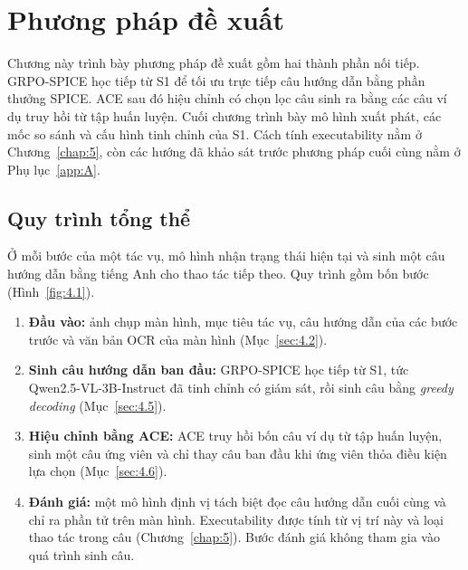 \chapter{Phương pháp đề xuất}
\label{chap:4}

Chương này trình bày phương pháp đề xuất gồm hai thành phần nối tiếp. GRPO-SPICE học tiếp từ S1 để tối ưu trực tiếp câu hướng dẫn bằng phần thưởng SPICE. ACE sau đó hiệu chỉnh có chọn lọc câu sinh ra bằng các câu ví dụ truy hồi từ tập huấn luyện. Cuối chương trình bày mô hình xuất phát, các mốc so sánh và cấu hình tinh chỉnh của S1. Cách tính executability nằm ở Chương~\ref{chap:5}, còn các hướng đã khảo sát trước phương pháp cuối cùng nằm ở Phụ lục~\ref{app:A}.

\section{Quy trình tổng thể}\label{sec:4.1}\label{sec:4.4}

Ở mỗi bước của một tác vụ, mô hình nhận trạng thái hiện tại và sinh một câu hướng dẫn bằng tiếng Anh cho thao tác tiếp theo. Quy trình gồm bốn bước (Hình~\ref{fig:4.1}).

\begin{enumerate}
\item \textbf{Đầu vào:} ảnh chụp màn hình, mục tiêu tác vụ, câu hướng dẫn của các bước trước và văn bản OCR của màn hình (Mục~\ref{sec:4.2}).
\item \textbf{Sinh câu hướng dẫn ban đầu:} GRPO-SPICE học tiếp từ S1, tức Qwen2.5-VL-3B-Instruct đã tinh chỉnh có giám sát, rồi sinh câu bằng \emph{greedy decoding} (Mục~\ref{sec:4.5}).
\item \textbf{Hiệu chỉnh bằng ACE:} ACE truy hồi bốn câu ví dụ từ tập huấn luyện, sinh một câu ứng viên và chỉ thay câu ban đầu khi ứng viên thỏa điều kiện lựa chọn (Mục~\ref{sec:4.6}).
\item \textbf{Đánh giá:} một mô hình định vị tách biệt đọc câu hướng dẫn cuối cùng và chỉ ra phần tử trên màn hình. Executability được tính từ vị trí này và loại thao tác trong câu (Chương~\ref{chap:5}). Bước đánh giá không tham gia vào quá trình sinh câu.
\end{enumerate}

